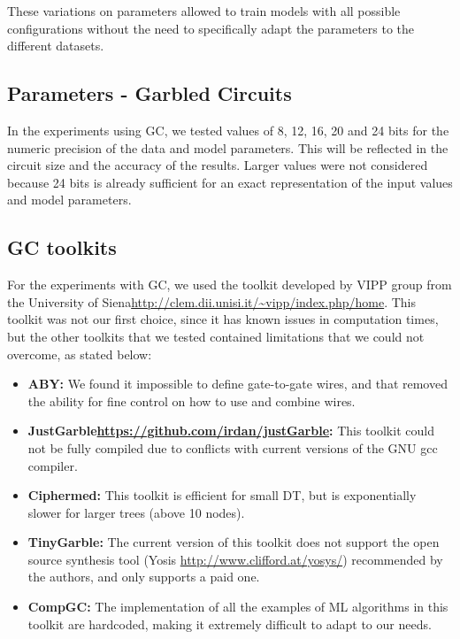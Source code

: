 These variations on parameters allowed to train models with all possible configurations without the need to specifically adapt the parameters to the different datasets.



\subsection{Parameters - Garbled Circuits}

In the experiments using \ac{GC}, we tested values of 8, 12, 16, 20 and 24 bits for the numeric precision of the data and model parameters. This will be reflected in the circuit size and the accuracy of the results. Larger values were not considered because 24 bits is already sufficient for an exact representation of the input values and model parameters.


\subsection{GC toolkits}


For the experiments with \ac{GC}, we used the toolkit developed by VIPP group from the University of Siena\url{http://clem.dii.unisi.it/~vipp/index.php/home}. This toolkit was not our first choice, since it has known issues in computation times, but the other toolkits that we tested contained limitations that we could not overcome, as stated below:

\begin{itemize}
    \setlength\itemsep{1em}
    \item\textbf{ABY\cite{demmler2015aby}:} We found it impossible to define gate-to-gate wires, and that removed the ability for fine control on how to use and combine wires.

    \item\textbf{JustGarble\url{https://github.com/irdan/justGarble}:} This toolkit could not be fully compiled due to conflicts with current versions of the GNU gcc compiler.

    \item\textbf{Ciphermed\cite{bost2015machine}:} This toolkit is efficient for small \ac{DT}, but is exponentially slower for larger trees (above 10 nodes).

    \item\textbf{TinyGarble\cite{songhori2015tinygarble}:} The current version of this toolkit does not support the open source synthesis tool (Yosis \url{http://www.clifford.at/yosys/}) recommended by the authors, and only supports a paid one.

    \item\textbf{CompGC\cite{groce2016compgc}:} The implementation of all the examples of \ac{ML} algorithms in this toolkit are hardcoded, making it extremely difficult to adapt to our needs.

\end{itemize}




